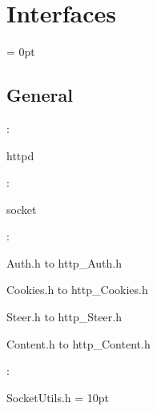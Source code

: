 
\section{Interfaces} 


\parskip = 0pt

\vspace{3mm} \subsection*{General}

: 

httpd
\vspace{2mm}

: 

socket
\vspace{2mm}

\vspace{5mm}

: 



Auth.h to http\_Auth.h

Cookies.h to http\_Cookies.h

Steer.h to http\_Steer.h

Content.h to http\_Content.h
\vspace{2mm}

: 

SocketUtils.h
\vspace{2mm}\parskip = 10pt 

